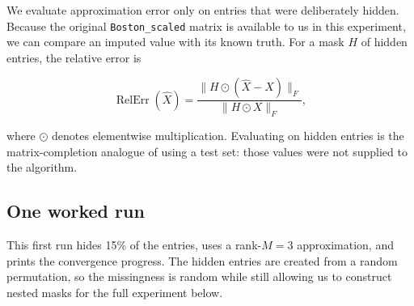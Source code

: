 \documentclass[
  11pt,
]{article}
\begin{document}
We evaluate approximation error only on entries that were deliberately
hidden. Because the original \texttt{Boston\_scaled} matrix is available
to us in this experiment, we can compare an imputed value with its known
truth. For a mask \(H\) of hidden entries, the relative error is

\[
\operatorname{RelErr}(\widehat X)
= \frac{\|H\odot(\widehat X-X)\|_F}
{\|H\odot X\|_F},
\]

where \(\odot\) denotes elementwise multiplication. Evaluating on hidden
entries is the matrix-completion analogue of using a test set: those
values were not supplied to the algorithm.

\subsection{One worked run}\label{one-worked-run}

This first run hides 15\% of the entries, uses a rank-\(M=3\)
approximation, and prints the convergence progress. The hidden entries
are created from a random permutation, so the missingness is random
while still allowing us to construct nested masks for the full
experiment below.
\end{document}
